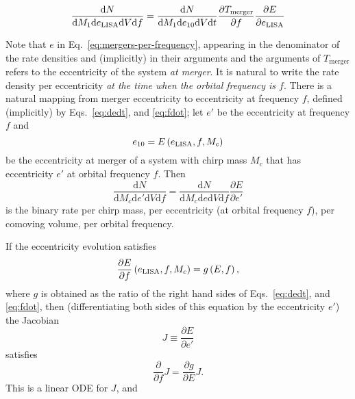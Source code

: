 \documentclass[twocolumn]{aastex631}
\newcommand{\dd}{\mathrm{d}}
\newcommand{\diff}[2]{\frac{\dd #1}{\dd #2}}
\begin{document}
\begin{equation}
    \label{eq:mergers-per-frequency}
    \diff{N}{M_1 \dd e_{\rm LISA} \dd V \dd f} = \diff{N}{M_1 \dd e_{10} \dd V \dd t} \frac{\partial T_\mathrm{merger}}{\partial f} \frac{\partial E}{\partial e_{\rm LISA}}
\end{equation}

Note that $e$ in Eq.\ \eqref{eq:mergers-per-frequency}, appearing in the
denominator of the rate densities and (implicitly) in their arguments and the
arguments of $T_\mathrm{merger}$ refers to the eccentricity of the system
\emph{at merger}.  It is natural to write the rate density per eccentricity
\emph{at the time when the orbital frequency is $f$}.  There is a natural
mapping from merger eccentricity to eccentricity at frequency $f$, defined
(implicitly) by Eqs.\ \eqref{eq:dedt}, and \eqref{eq:fdot}; let
$e'$ be the eccentricity at frequency $f$ and 
\begin{equation}
    e_{10} = E\left( e_{\rm LISA}, f, M_c \right)
\end{equation}
be the eccentricity at merger of a system with chirp mass $M_c$ that has
eccentricity $e'$ at orbital frequency $f$.  Then 
\begin{equation}
    \diff{N}{M_c \dd e' \dd V \dd f} = \diff{N}{M_c \dd e \dd V \dd f} \frac{\partial E}{\partial e'}
\end{equation}
is the binary rate per chirp mass, per eccentricity (at orbital frequency $f$),
per comoving volume, per orbital frequency.  

If the eccentricity evolution satisfies 
\begin{equation}
    \frac{\partial E}{\partial f}\left( e_{\rm LISA}, f, M_c \right) = g\left( E, f \right),
\end{equation}
where $g$ is obtained as the ratio of the right hand sides of Eqs.\
\eqref{eq:dedt}, and \eqref{eq:fdot}, then (differentiating both sides of this
equation by the eccentricity $e'$) the Jacobian 
\begin{equation}
    J \equiv \frac{\partial E}{\partial e'}
\end{equation}
satisfies 
\begin{equation}
    \frac{\partial}{\partial f} J = \frac{\partial g}{\partial E} J.
\end{equation}
This is a linear ODE for $J$, and 



\end{document}
